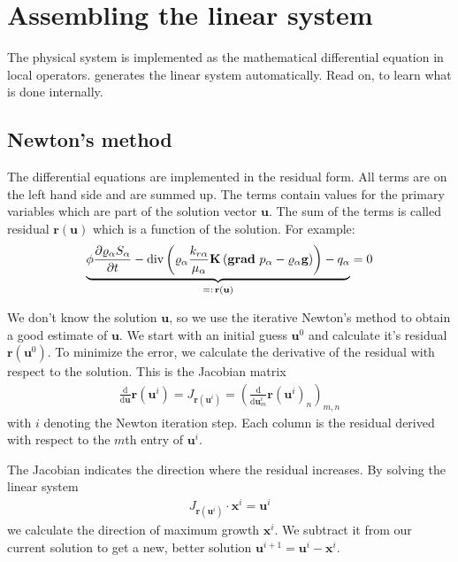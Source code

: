 \section{Assembling the linear system}
\label{sc_linearsystem}
The physical system is implemented as the mathematical differential equation in
local operators. \Dumux generates the linear system automatically. Read on, to
learn what is done internally.

\subsection{Newton's method}
The differential equations are implemented in the residual form. All terms are
on the left hand side and are summed up. The terms contain values for the primary
variables which are part of the solution vector $\textbf{u}$. The sum of the terms
is called residual $\textbf{r}(\textbf{u})$ which is a function of the solution. For
example:
\begin{align*}
\underbrace{
  \phi \frac{\partial \varrho_\alpha S_\alpha}{\partial t}
 -
 \text{div} \left(
 \varrho_\alpha \frac{k_{r\alpha}}{\mu_\alpha} \mbox{\bf K}
 \left(\operatorname{\bf grad}\, p_\alpha - \varrho_{\alpha} \mbox{\bf g} \right)
 \right) - q_\alpha} _
{=: \, \textbf{r}(\textbf{u})}
= 0
\end{align*}

We don't know the solution $\textbf{u}$, so we use the iterative Newton's method to
obtain a good estimate of $\textbf{u}$. We start with an initial guess $\textbf{u}^0$ and
calculate it's residual $\textbf{r}(\textbf{u}^0)$. To minimize the error, we calculate
the derivative of the residual with respect to the solution. This is the Jacobian
matrix
\begin{align*}
  \frac{\text{d}}{\text{d}\textbf{u}}\textbf{r} \left(\textbf{u}^i\right)
  = J_{\textbf{r} \left(\textbf{u}^i\right)}
  = \left(\frac{\text{d}}{\text{d}\textbf{u}^i_m}\textbf{r} \left(\textbf{u}^i\right)_n\right)_{m,n}
\end{align*}
with $i$ denoting the Newton iteration step.
Each column is the residual derived with respect to the $m$th entry of $\textbf{u}^i$.

The Jacobian indicates the direction where the residual increases. By solving the
linear system
\begin{align*}
  J_{\textbf{r}(\textbf{u}^i)} \cdot \textbf{x}^i = \textbf{u}^i
\end{align*}
we calculate the direction of maximum growth $\textbf{x}^i$. We subtract it from
our current solution to get a new, better solution
$\textbf{u}^{i+1} = \textbf{u}^i - \textbf{x}^i$.

